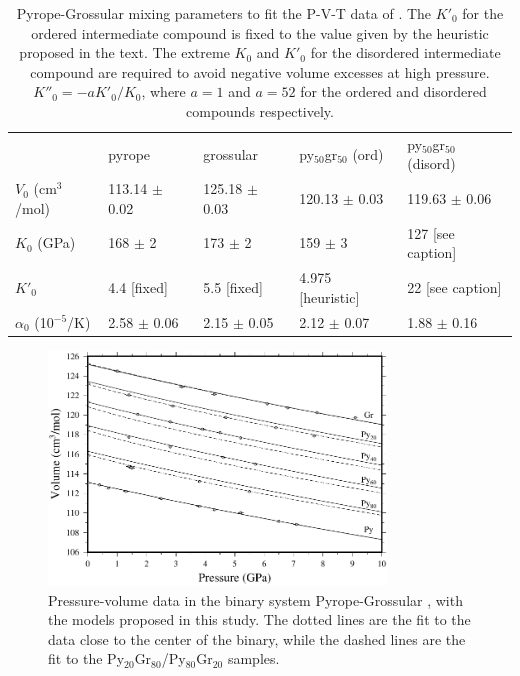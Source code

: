 \documentclass[review]{elsarticle}
\begin{document}
\begin{table}[ht!]
\centering
\caption{Pyrope-Grossular mixing parameters to fit the P-V-T data of \cite{DCW2015}. The $K'_0$ for the ordered intermediate compound is fixed to the value given by the heuristic proposed in the text. The extreme $K_0$ and $K'_0$ for the disordered intermediate compound are required to avoid negative volume excesses at high pressure. $K''_0 = -aK'_0/K_0$, where $a=1$ and $a=52$ for the ordered and disordered compounds respectively.}
\label{tab:py_gr}
\begin{tabular}{lllll}
                   & pyrope              & grossular             & py$_{50}$gr$_{50}$ (ord)  & py$_{50}$gr$_{50}$  (disord)   \\
$V_0$ (cm$^3$/mol) & 113.14 $\pm$ 0.02 &  125.18 $\pm$ 0.03      & 120.13 $\pm$ 0.03  & 119.63 $\pm$ 0.06 \\
$K_0$ (GPa)        & 168 $\pm$ 2       &  173 $\pm$ 2            & 159 $\pm$ 3   &    127 [see caption]  \\
$K'_0$             & 4.4 [fixed]              &  5.5 [fixed]     & 4.975 [heuristic]  &  22 [see caption] \\
$\alpha_0$ (10$^{-5}$/K)   &  2.58 $\pm$ 0.06   & 2.15 $\pm$ 0.05 & 2.12 $\pm$ 0.07  & 1.88 $\pm$ 0.16
\end{tabular}
\end{table}


\begin{figure}[ht!]
  \centering
  \includegraphics[width=0.8\textwidth]{figures/pyrope_grossular_P_V}
  \caption{Pressure-volume data in the binary system Pyrope-Grossular \citep{DCW2015}, with the models proposed in this study. The dotted lines are the fit to the data close to the center of the binary, while the dashed lines are the fit to the Py$_{20}$Gr$_{80}$/Py$_{80}$Gr$_{20}$ samples.}
  \label{fig:PV_pyrope_grossular}
\end{figure}
\end{document}
